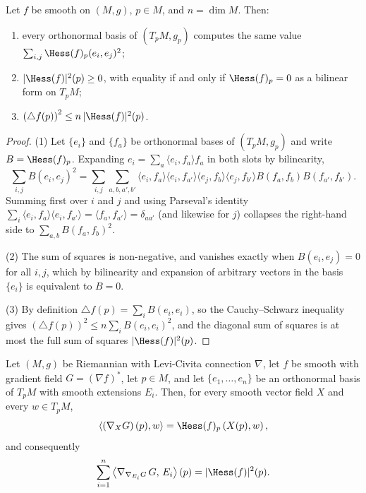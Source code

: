 \begin{lemma}
\label{lem:hessian-norm-sq-basic}
\leanok
Let $f$ be smooth on $(M,g)$, $p\in M$, and $n=\dim M$. Then:
\begin{enumerate}
\item every orthonormal basis of $(T_pM,g_p)$ computes the same
value $\sum_{i,j}\Hess(f)_p(e_i,e_j)^2$;
\item $|\Hess(f)|^2(p)\ge0$, with equality if and only if
$\Hess(f)_p=0$ as a bilinear form on $T_pM$;
\item $\left(\triangle f(p)\right)^2\le n\,|\Hess(f)|^2(p)$.
\end{enumerate}
\end{lemma}

\begin{proof}
\leanok
(1) Let $\{e_i\}$ and $\{f_a\}$ be orthonormal bases of
$(T_pM,g_p)$ and write $B=\Hess(f)_p$. Expanding
$e_i=\sum_a\langle e_i,f_a\rangle f_a$ in both slots by bilinearity,
$$\sum_{i,j}B(e_i,e_j)^2
=\sum_{i,j}\sum_{a,b,a',b'}\langle e_i,f_a\rangle\langle
e_i,f_{a'}\rangle\langle e_j,f_b\rangle\langle e_j,f_{b'}\rangle
B(f_a,f_b)B(f_{a'},f_{b'}).$$
Summing first over $i$ and $j$ and using Parseval's identity
$\sum_i\langle e_i,f_a\rangle\langle e_i,f_{a'}\rangle
=\langle f_a,f_{a'}\rangle=\delta_{aa'}$ (and likewise for $j$)
collapses the right-hand side to $\sum_{a,b}B(f_a,f_b)^2$.

(2) The sum of squares is non-negative, and vanishes exactly when
$B(e_i,e_j)=0$ for all $i,j$, which by bilinearity and expansion of
arbitrary vectors in the basis $\{e_i\}$ is equivalent to $B=0$.

(3) By definition $\triangle f(p)=\sum_iB(e_i,e_i)$, so the
Cauchy--Schwarz inequality gives
$\left(\triangle f(p)\right)^2\le n\sum_iB(e_i,e_i)^2$, and the
diagonal sum of squares is at most the full sum of squares
$|\Hess(f)|^2(p)$.
\end{proof}

\begin{lemma}
\label{lem:hessian-riesz-trace}
\leanok
Let $(M,g)$ be Riemannian with Levi-Civita connection $\nabla$, let
$f$ be smooth with gradient field $G=(\nabla f)^*$, let $p\in M$,
and let $\{e_1,\ldots,e_n\}$ be an orthonormal basis of $T_pM$ with
smooth extensions $E_i$. Then, for every smooth vector field $X$ and
every $w\in T_pM$,
$$\left\langle\left(\nabla_XG\right)(p),w\right\rangle
=\Hess(f)_p\left(X(p),w\right),$$
and consequently
$$\sum_{i=1}^n\left\langle\nabla_{\nabla_{E_i}G}\,G,\,E_i
\right\rangle(p)=|\Hess(f)|^2(p).$$
\end{lemma}

